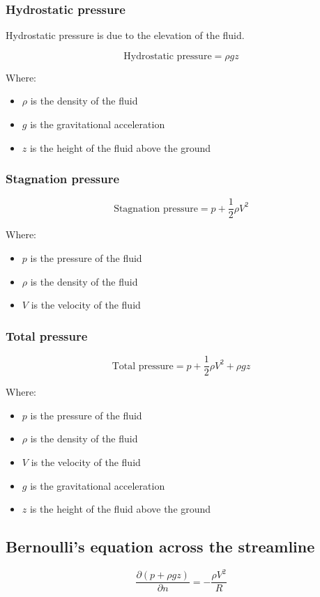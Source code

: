 \documentclass[11pt]{article}
\begin{document}
\subsubsection{Hydrostatic pressure}
\label{sec:orgb800cc4}
Hydrostatic pressure is due to the elevation of the fluid.

\[\text{Hydrostatic pressure} = \rho g z\]

Where:
\begin{itemize}
\item \(\rho\) is the density of the fluid
\item \(g\) is the gravitational acceleration
\item \(z\) is the height of the fluid above the ground
\end{itemize}

\subsubsection{Stagnation pressure}
\label{sec:org7a8bc8a}
\[\text{Stagnation pressure} = p + \frac{1}{2} \rho V^2\]

Where:
\begin{itemize}
\item \(p\) is the pressure of the fluid
\item \(\rho\) is the density of the fluid
\item \(V\) is the velocity of the fluid
\end{itemize}

\newpage

\subsubsection{Total pressure}
\label{sec:orge762b7b}
\[\text{Total pressure} = p + \frac{1}{2} \rho V^2 + \rho g z\]

Where:
\begin{itemize}
\item \(p\) is the pressure of the fluid
\item \(\rho\) is the density of the fluid
\item \(V\) is the velocity of the fluid
\item \(g\) is the gravitational acceleration
\item \(z\) is the height of the fluid above the ground
\end{itemize}

\subsection{Bernoulli's equation across the streamline}
\label{sec:orgd12c2c1}
\[\frac{\partial \left(p + \rho g z \right)}{\partial n} = - \frac{\rho V^2}{R}\]
\end{document}

